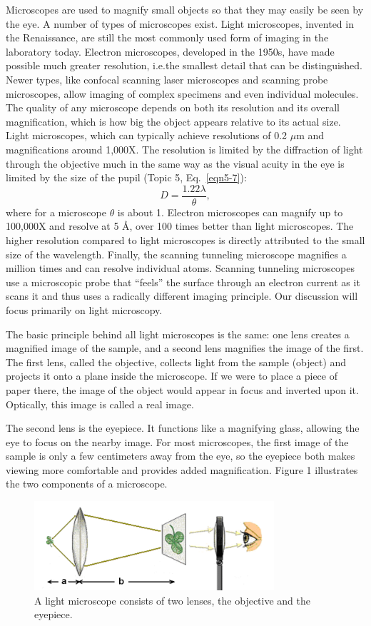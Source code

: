 Microscopes are used to magnify small objects so that they may easily be seen by the eye.  A number of types of microscopes exist.  Light microscopes, invented in the Renaissance, are still the most commonly used form of imaging in the laboratory today.  Electron microscopes, developed in the 1950s, have made possible much greater resolution, i.e.the smallest detail that can be distinguished.  Newer types, like confocal scanning laser microscopes and scanning probe microscopes, allow imaging of complex specimens and even individual molecules.  The quality of any microscope depends on both its resolution and its overall magnification, which is how big the object appears relative to its actual size.  Light microscopes, which can typically achieve resolutions of 0.2 $\mu$m and magnifications around 1,000X. The resolution is limited by the diffraction of light through the objective much in the same way as the visual acuity in the eye is limited by the size of the pupil (Topic 5, Eq.~\ref{eqn5-7}):
$$D=\frac{1.22\lambda}{\theta},$$ 
where for a microscope $\theta$ is about 1.  Electron microscopes can magnify up to 100,000X and resolve at 5 $\text{\AA}$, over 100 times better than light microscopes. The higher resolution compared to light microscopes is directly attributed to the small size of the wavelength.  Finally, the scanning tunneling microscope magnifies a million times and can resolve individual atoms. Scanning tunneling microscopes use a microscopic probe that ``feels'' the surface through an electron current as it scans it and thus uses a radically different imaging principle.  Our discussion will focus primarily on light microscopy.

The basic principle behind all light microscopes is the same: one lens creates a magnified image of the sample, and a second lens magnifies the image of the first.  The first lens, called the objective, collects light from the sample (object) and projects it onto a plane inside the microscope.  If we were to place a piece of paper there, the image of the object would appear in focus and inverted upon it.  Optically, this image is called a real image.

The second lens is the eyepiece.  It functions like a magnifying glass, allowing the eye to focus on the nearby image.  For most microscopes, the first image of the sample is only a few centimeters away from the eye, so the eyepiece both makes viewing more comfortable and provides added magnification.  Figure 1 illustrates the two components of a microscope.  
\begin{figure}[!htb]
	\centering
	\includegraphics[width=3.5in]{./figures/Topic10/Fig10-1.png}
	\caption{A light microscope consists of two lenses, the objective and the eyepiece.}
	\label{Fig10-1}
\end{figure}

